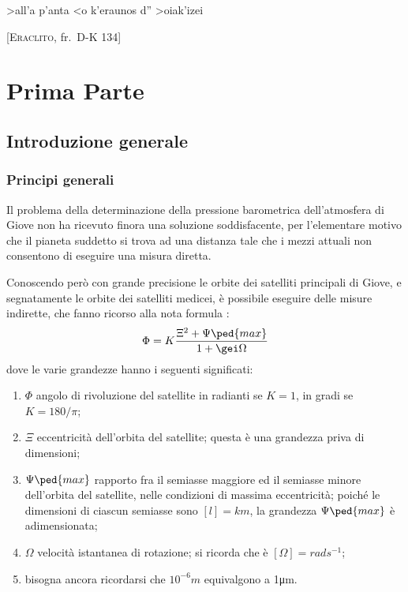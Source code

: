 \documentclass[%
    corpo=11pt,
    twoside,
    oldstyle,
    tipotesi=magistrale,
    greek,
    evenboxes,
]{toptesi}
\begin{document}
{\begin{citazioni}
    \vspace{1em}

    \textgreek{>all'a p'anta <o k'eraunos d'' >oiak'izei}

    [\textsc{Eraclito}, fr.\ D-K 134]
\end{citazioni}

\fi
\mainmatter

\part{Prima Parte}
\chapter{Introduzione generale}

\section{Principi generali}
Il problema della determinazione della pressione barometrica dell'atmosfera di
Giove non ha ricevuto finora una soluzione soddisfacente, per l'elementare
motivo che il pianeta suddetto si trova ad una distanza tale che i mezzi attuali
non consentono di eseguire una misura diretta.

Conoscendo per\`o con grande precisione le orbite dei satelliti principali di
Giove, e segnatamente le orbite dei satelliti medicei, \`e possibile eseguire
delle misure indirette, che fanno ricorso alla nota formula \cite{gal}:
\[
\Phi = K\frac{\Xi^2 +\Psi\ped{max}}{1+\gei\Omega}
\]
dove le varie grandezze hanno i seguenti significati:
\begin{enumerate}
\item
$\Phi$ angolo di rivoluzione del satellite in radianti se $K=1$, in gradi se
$K=180/\pi$;
\item
$\Xi$ eccentricit\`a dell'orbita del satellite; questa \`e una grandezza priva
di dimensioni;
\item
$\Psi\ped{max}$ rapporto fra il semiasse maggiore ed il semiasse minore
dell'orbita del satellite, nelle condizioni di massima eccentricit\`a;
poich\'e le dimensioni di ciascun semiasse sono $[l]=\unit{km}$, la grandezza
$\Psi\ped{max}$ {\`e} adimensionata;
\item
$\Omega$ velocit\`a istantanea di rotazione; si ricorda che \`e $[\Omega]=%
\unit{rad}\unit{s}^{-1}$;
\item bisogna ancora ricordarsi che $10^{-6}\unit{m}$ equivalgono a 1\unit{\micro m}.
\end{enumerate}
%

}
\end{document}
